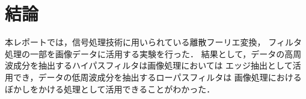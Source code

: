 \chapter{結論}

本レポートでは，信号処理技術に用いられている離散フーリエ変換，
フィルタ処理の一部を画像データに活用する実験を行った．
結果として，データの高周波成分を抽出するハイパスフィルタは画像処理においては
エッジ抽出として活用でき，データの低周波成分を抽出するローパスフィルタは
画像処理におけるぼかしをかける処理として活用できることがわかった．
